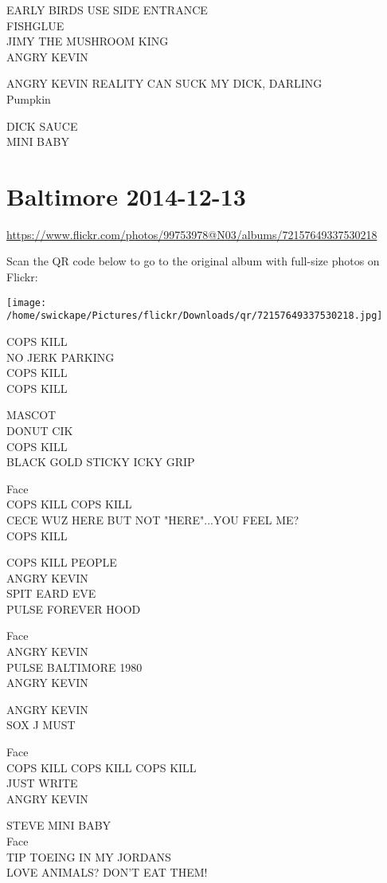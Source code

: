 \documentclass[10pt,letterpaper]{article}
\begin{document}
EARLY BIRDS USE SIDE ENTRANCE\\
FISHGLUE\\
JIMY THE MUSHROOM KING\\
ANGRY KEVIN

ANGRY KEVIN REALITY CAN SUCK MY DICK, DARLING\\
Pumpkin

DICK SAUCE\\
MINI BABY


\section*{Baltimore 2014-12-13}

\url{https://www.flickr.com/photos/99753978@N03/albums/72157649337530218}

Scan the QR code below to go to the original album with full-size photos on Flickr:

\texttt{[image: /home/swickape/Pictures/flickr/Downloads/qr/72157649337530218.jpg]}


COPS KILL\\
NO JERK PARKING\\
COPS KILL\\
COPS KILL

MASCOT\\
DONUT CIK\\
COPS KILL\\
BLACK GOLD STICKY ICKY GRIP

Face\\
COPS KILL COPS KILL\\
CECE WUZ HERE BUT NOT "HERE"...YOU FEEL ME?\\
COPS KILL

COPS KILL PEOPLE\\
ANGRY KEVIN\\
SPIT EARD EVE\\
PULSE FOREVER HOOD

Face\\
ANGRY KEVIN\\
PULSE BALTIMORE 1980\\
ANGRY KEVIN

ANGRY KEVIN\\
SOX J MUST

Face\\
COPS KILL COPS KILL COPS KILL\\
JUST WRITE\\
ANGRY KEVIN

STEVE MINI BABY\\
Face\\
TIP TOEING IN MY JORDANS\\
LOVE ANIMALS?  DON'T EAT THEM!
\end{document}
